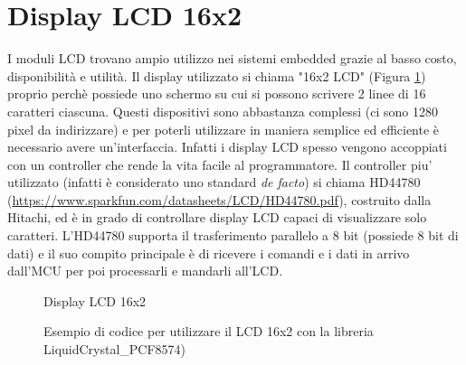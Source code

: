 \documentclass[12pt]{report}
\begin{document}
%
\section{Display LCD 16x2}
%

I moduli LCD trovano ampio utilizzo nei sistemi embedded grazie al basso costo, disponibilità e utilità. Il display utilizzato si chiama "16x2 LCD" (Figura \ref{fig:16x2}) proprio perchè possiede uno schermo su cui si possono scrivere 2 linee di 16 caratteri ciascuna. Questi dispositivi sono abbastanza complessi (ci sono 1280 pixel da indirizzare) e per poterli utilizzare in maniera semplice ed efficiente è necessario avere un'interfaccia. Infatti i display LCD spesso vengono accoppiati con un controller che rende la vita facile al programmatore. Il controller piu' utilizzato (infatti è considerato uno standard \textit{de facto}) si chiama HD44780 (\url{https://www.sparkfun.com/datasheets/LCD/HD44780.pdf}), costruito dalla Hitachi, ed è in grado di controllare display LCD capaci di visualizzare solo caratteri. L'HD44780 supporta il trasferimento parallelo a 8 bit (possiede 8 bit di dati) e il suo compito principale è di ricevere i comandi e i dati in arrivo dall'MCU per poi processarli
e mandarli all'LCD.

\begin{figure}
	\caption{Display LCD 16x2}
	\label{fig:16x2}
\end{figure}

\begin{figure}
	\caption{Esempio di codice per utilizzare il LCD 16x2 con la libreria LiquidCrystal\_PCF8574)}
	\label{fig:lcd_code}
\end{figure}
\end{document}
